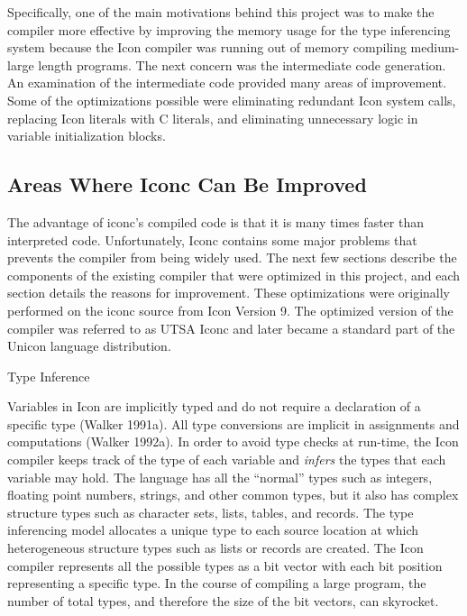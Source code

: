 Specifically, one of the main motivations behind this project was to
make the compiler more effective by improving the memory usage for the
type inferencing system because the Icon compiler was running out of
memory compiling medium-large length programs. The next concern was
the intermediate code generation. An examination of the intermediate
code provided many areas of improvement. Some of the optimizations
possible were eliminating redundant Icon system calls, replacing Icon
literals with C literals, and eliminating unnecessary logic in
variable initialization blocks.

\subsection{Areas Where Iconc Can Be Improved}

The advantage of iconc's compiled code is that it is many times faster
than interpreted code. Unfortunately, Iconc contains some major
problems that prevents the compiler from being widely used. The next
few sections describe the components of the existing compiler that
were optimized in this project, and each section details the reasons
for improvement.  These optimizations were originally performed on the
iconc source from Icon Version 9. The optimized version of the
compiler was referred to as UTSA Iconc and later became a standard part
of the Unicon language distribution.

\bigskip

{\sffamily Type Inference}

Variables in Icon are implicitly typed and do not require a
declaration of a specific type (Walker 1991a). All type conversions
are implicit in assignments and computations (Walker 1992a). In
order to avoid type checks at run-time, the Icon compiler keeps track
of the type of each variable and \textit{infers} the types that each
variable may hold. The language has all the ``normal'' types such as
integers, floating point numbers, strings, and other common types, but
it also has complex structure types such as character sets, lists,
tables, and records. The type inferencing model allocates a unique
type to each source location at which heterogeneous structure types
such as lists or records are created. The Icon compiler represents all
the possible types as a bit vector with each bit position representing
a specific type. In the course of compiling a large program, the
number of total types, and therefore the size of the bit vectors, can
skyrocket.

